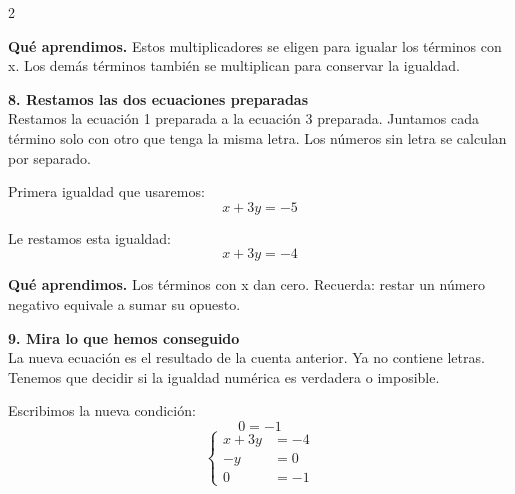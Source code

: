 \documentclass[11pt,a4paper,landscape]{article}
\begin{document}
\begin{multicols*}{2}
\begin{minipage}{\linewidth}
\par\smallskip\textbf{Qué aprendimos.} Estos multiplicadores se eligen para igualar los términos con x. Los demás términos también se multiplican para conservar la igualdad.
\end{minipage}\par\medskip
\noindent\begin{minipage}{\linewidth}\textbf{8. Restamos las dos ecuaciones preparadas}\\[2pt]Restamos la ecuación 1 preparada a la ecuación 3 preparada. Juntamos cada término solo con otro que tenga la misma letra. Los números sin letra se calculan por separado.
\par{}\par\smallskip
\par\smallskip Primera igualdad que usaremos:
\[x + 3y = -5\]
\par\smallskip Le restamos esta igualdad:
\[x + 3y = -4\]
\par\smallskip\textbf{Qué aprendimos.} Los términos con x dan cero. Recuerda: restar un número negativo equivale a sumar su opuesto.
\end{minipage}\par\medskip
\noindent\begin{minipage}{\linewidth}\textbf{9. Mira lo que hemos conseguido}\\[2pt]La nueva ecuación es el resultado de la cuenta anterior. Ya no contiene letras. Tenemos que decidir si la igualdad numérica es verdadera o imposible.
\par\smallskip Escribimos la nueva condición:
\[0 = -1\]
\[\left\{\begin{aligned}x + 3y &= -4\\-y &= 0\\0 &= -1\end{aligned}\right.\]

\end{minipage}
\end{multicols*}
\end{document}
